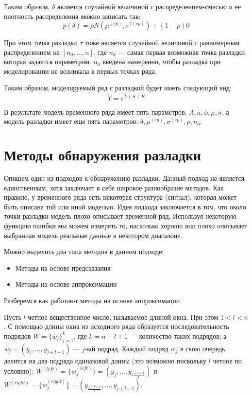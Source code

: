 \documentclass[%
12pt,
master,  %
natbib,      %
subf,        %
substylefile = spbu.rtx,
href,        %
colorlinks,  %
]{disser}
\begin{document}
Таким образом, $\delta$ является случайной величиной с распределением-смесью и ее плотность распределения можно записать так:
$$ p(\delta) = \rho N(\mu^{(cp)}, \sigma^{2(cp)}) + (1-\rho) 0$$


При этом точка разладки  $\tau$ тоже является случайной величиной с равномерным распределением на $ [n_0, \dots, n ] $, где $ n_0 $ --- самая первая возможная точка разладки, которая задается параметром. $n_0$ введена намеренно, чтобы разладка при моделировании не возникала в первых точках ряда.

Таким образом, моделируемый ряд с разладкой будет иметь следующий вид:
$$ Y = e^{\tilde{T} + S + E}  $$

В результате модель временного ряда имеет пять параметров: $ A, a, \phi, \mu, \sigma $, а модель разладки имеет еще пять параметров: $ \delta, \mu^{(cp)}, \sigma^{(cp)}, \rho, n_0 $.

\section{Методы обнаружения разладки}


Опишем один из подходов к обнаружению разладки. Данный подход не является единственным, хотя заключает в себе широкое разнообразие методов. Как правило, у временного ряда есть некоторая структура (сигнал), которая может быть описана той или иной моделью. Идея подхода заключается в том, что около точки разладки модель плохо описывает временной ряд. Используя некоторую функцию ошибки мы можем измерять то, насколько хорошо или плохо описывает выбранная модель реальные данные в некотором диапазоне. 

Можно выделить два типа методов в данном подходе:
\begin{itemize}
	\item Методы на основе предсказания
	\item Методы на основе аппроксимации
\end{itemize}

Разберемся как работают методы на основе аппроксимации.

Пусть $l$ четное вещественное число, называемое длиной окна. При этом  $ 1 < l < n $. С помощью длины окна из исходного ряда образуется последовательность подрядов $W = \{ w_j \}_{j=1}^k$, где $k = n - l + 1$ --- количество таких подрядов; а $ w_j = (y_j, \dots, y_{j+l+1}) $ --- $j$-ый подряд. Каждый подряд  $w_j$  в свою очередь делится на два подряда одинаковой длины (это возможно поскольку $l$ четное по условию): $ W^{(left)} = \{w_j^{(left)} \}  =  (y_j, \dots, y_{\frac{j+l+1}{2}})$ и $W^{(right)} = \{w_j^{(right)} \} = (y_{\frac{j+l+1}{2}}, \dots, y_{j+l+1})$.
\end{document}
